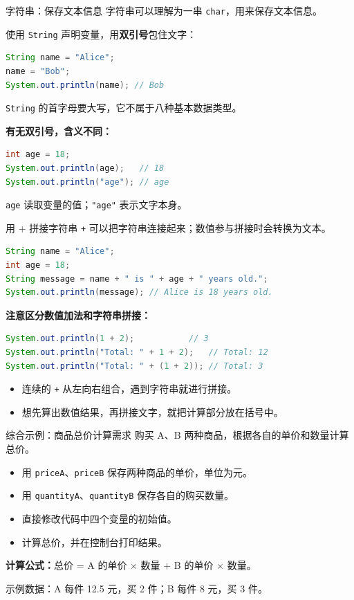 \documentclass[aspectratio=169]{beamer}
\begin{document}
\begin{frame}[fragile]{字符串：保存文本信息}
  字符串可以理解为一串 \texttt{char}，用来保存文本信息。
  \par\medskip
  使用 \texttt{String} 声明变量，用\textbf{双引号}包住文字：
  \begin{lstlisting}[language=Java]
String name = "Alice";
name = "Bob";
System.out.println(name); // Bob
  \end{lstlisting}
  \texttt{String} 的首字母要大写，它不属于八种基本数据类型。
  \par\medskip
  \textbf{有无双引号，含义不同：}
  \begin{lstlisting}[language=Java]
int age = 18;
System.out.println(age);   // 18
System.out.println("age"); // age
  \end{lstlisting}
  \texttt{age} 读取变量的值；\texttt{"age"} 表示文字本身。
\end{frame}

\begin{frame}[fragile]{用 + 拼接字符串}
  \texttt{+} 可以把字符串连接起来；数值参与拼接时会转换为文本。
  \begin{lstlisting}[language=Java]
String name = "Alice";
int age = 18;
String message = name + " is " + age + " years old.";
System.out.println(message); // Alice is 18 years old.
  \end{lstlisting}
  \textbf{注意区分数值加法和字符串拼接：}
  \begin{lstlisting}[language=Java]
System.out.println(1 + 2);           // 3
System.out.println("Total: " + 1 + 2);   // Total: 12
System.out.println("Total: " + (1 + 2)); // Total: 3
  \end{lstlisting}
  \begin{itemize}
    \item 连续的 \texttt{+} 从左向右组合，遇到字符串就进行拼接。
    \item 想先算出数值结果，再拼接文字，就把计算部分放在括号中。
  \end{itemize}
\end{frame}

\begin{frame}{综合示例：商品总价计算需求}
  购买 A、B 两种商品，根据各自的单价和数量计算总价。
  \par\bigskip
  \begin{itemize}
    \item 用 \texttt{priceA}、\texttt{priceB} 保存两种商品的单价，单位为元。
    \item 用 \texttt{quantityA}、\texttt{quantityB} 保存各自的购买数量。
    \item 直接修改代码中四个变量的初始值。
    \item 计算总价，并在控制台打印结果。
  \end{itemize}
  \bigskip
  \textbf{计算公式：}总价 = A 的单价 $\times$ 数量 + B 的单价 $\times$ 数量。
  \par\medskip
  示例数据：A 每件 12.5 元，买 2 件；B 每件 8 元，买 3 件。
\end{frame}
\end{document}
